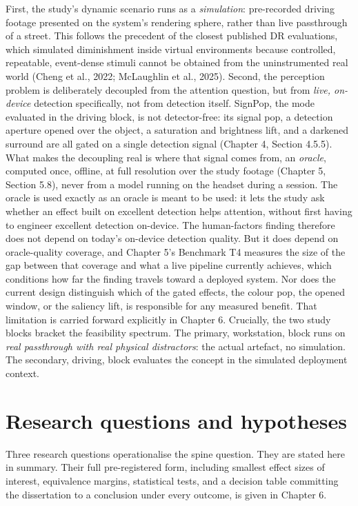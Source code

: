 First, the study's dynamic scenario runs as a \textit{simulation}: pre-recorded driving footage presented on
the system's rendering sphere, rather than live passthrough of a street. This follows the precedent
of the closest published DR evaluations, which simulated diminishment inside virtual environments
because controlled, repeatable, event-dense stimuli cannot be obtained from the uninstrumented real
world (Cheng et al., 2022; McLaughlin et al., 2025). Second, the perception problem is
deliberately decoupled from the attention question, but from \textit{live, on-device} detection
specifically, not from detection itself. SignPop, the mode evaluated in the driving block, is not
detector-free: its signal pop, a detection aperture opened over the object, a saturation and brightness
lift, and a darkened surround are all gated on a single detection signal (Chapter 4, Section 4.5.5).
What makes the decoupling real is where that signal comes from, an \textit{oracle}, computed once,
offline, at full resolution over the study footage (Chapter 5, Section 5.8), never from a model
running on the headset during a session. The oracle is used exactly as an oracle is meant to be
used: it lets the study ask whether an effect built on excellent detection helps attention, without
first having to engineer excellent detection on-device. The human-factors finding therefore does not
depend on today's on-device detection quality. But it does depend on oracle-quality coverage, and
Chapter 5's Benchmark T4 measures the size of the gap between that coverage and what a live pipeline
currently achieves, which conditions how far the finding travels toward a deployed system. Nor does
the current design distinguish which of the gated effects, the colour pop, the opened window, or
the saliency lift, is responsible for any measured benefit. That limitation is carried forward
explicitly in Chapter 6. Crucially, the two study blocks bracket the feasibility spectrum.
The primary, workstation, block runs on \textit{real passthrough with real physical distractors}: the
actual artefact, no simulation. The secondary, driving, block evaluates the concept in the
simulated deployment context.

\section{Research questions and hypotheses}

Three research questions operationalise the spine question. They are stated here in summary. Their
full pre-registered form, including smallest effect sizes of interest, equivalence margins,
statistical tests, and a decision table committing the dissertation to a conclusion under every
outcome, is given in Chapter 6.

